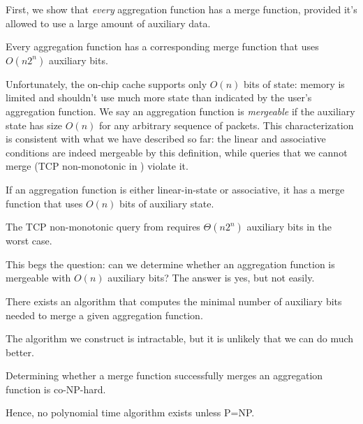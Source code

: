 First, we show that \emph{every} aggregation function has a merge function, provided it's allowed to use
a large amount of auxiliary data.
\begin{theorem}
Every aggregation function has a corresponding merge function that uses
$O(n2^n)$ auxiliary bits.
\end{theorem}
Unfortunately, the on-chip cache supports only $O(n)$ bits of state: memory is limited
and \TheSystem shouldn't use much more state than indicated by the user's aggregation function.
We say an aggregation function
is \emph{mergeable} if the auxiliary state has size $O(n)$ for any arbitrary sequence of packets.
This characterization is consistent with what we
have described so far: the linear and associative conditions are indeed mergeable by this definition,
while queries that we cannot merge (\eg TCP non-monotonic in
) violate it.
\begin{theorem}
If an aggregation function is either linear-in-state or associative, it has a merge function
that uses $O(n)$ bits of auxiliary state.
\end{theorem}
\begin{theorem}
The TCP non-monotonic query from  requires $\Theta(n2^n)$ auxiliary bits
in the worst case.
\end{theorem}
This begs the question: can we determine whether an aggregation function
is mergeable with $O(n)$ auxiliary bits? The answer is yes, but not easily.
\begin{theorem}
There exists an algorithm that computes the minimal number of auxiliary bits needed to merge a
given aggregation function.
\end{theorem}
The algorithm we construct is intractable, but it is unlikely that we can do much
better.
\begin{theorem}
Determining whether a merge function successfully merges an aggregation function
is co-NP-hard.
\end{theorem}
Hence, no polynomial time algorithm exists unless P=NP. 

